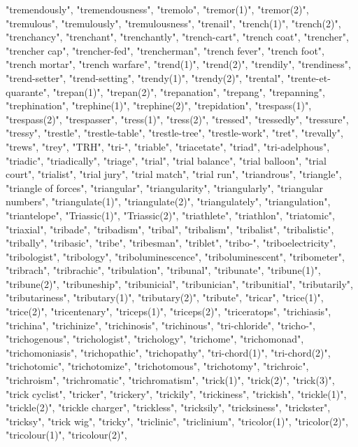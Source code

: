 "tremendously",
"tremendousness",
"tremolo",
"tremor(1)",
"tremor(2)",
"tremulous",
"tremulously",
"tremulousness",
"trenail",
"trench(1)",
"trench(2)",
"trenchancy",
"trenchant",
"trenchantly",
"trench-cart",
"trench coat",
"trencher",
"trencher cap",
"trencher-fed",
"trencherman",
"trench fever",
"trench foot",
"trench mortar",
"trench warfare",
"trend(1)",
"trend(2)",
"trendily",
"trendiness",
"trend-setter",
"trend-setting",
"trendy(1)",
"trendy(2)",
"trental",
"trente-et-quarante",
"trepan(1)",
"trepan(2)",
"trepanation",
"trepang",
"trepanning",
"trephination",
"trephine(1)",
"trephine(2)",
"trepidation",
"trespass(1)",
"trespass(2)",
"trespasser",
"tress(1)",
"tress(2)",
"tressed",
"tressedly",
"tressure",
"tressy",
"trestle",
"trestle-table",
"trestle-tree",
"trestle-work",
"tret",
"trevally",
"trews",
"trey",
"TRH",
"tri-",
"triable",
"triacetate",
"triad",
"tri-adelphous",
"triadic",
"triadically",
"triage",
"trial",
"trial balance",
"trial balloon",
"trial court",
"trialist",
"trial jury",
"trial match",
"trial run",
"triandrous",
"triangle",
"triangle of forces",
"triangular",
"triangularity",
"triangularly",
"triangular numbers",
"triangulate(1)",
"triangulate(2)",
"triangulately",
"triangulation",
"triantelope",
"Triassic(1)",
"Triassic(2)",
"triathlete",
"triathlon",
"triatomic",
"triaxial",
"tribade",
"tribadism",
"tribal",
"tribalism",
"tribalist",
"tribalistic",
"tribally",
"tribasic",
"tribe",
"tribesman",
"triblet",
"tribo-",
"triboelectricity",
"tribologist",
"tribology",
"triboluminescence",
"triboluminescent",
"tribometer",
"tribrach",
"tribrachic",
"tribulation",
"tribunal",
"tribunate",
"tribune(1)",
"tribune(2)",
"tribuneship",
"tribunicial",
"tribunician",
"tribunitial",
"tributarily",
"tributariness",
"tributary(1)",
"tributary(2)",
"tribute",
"tricar",
"trice(1)",
"trice(2)",
"tricentenary",
"triceps(1)",
"triceps(2)",
"triceratops",
"trichiasis",
"trichina",
"trichinize",
"trichinosis",
"trichinous",
"tri-chloride",
"tricho-",
"trichogenous",
"trichologist",
"trichology",
"trichome",
"trichomonad",
"trichomoniasis",
"trichopathic",
"trichopathy",
"tri-chord(1)",
"tri-chord(2)",
"trichotomic",
"trichotomize",
"trichotomous",
"trichotomy",
"trichroic",
"trichroism",
"trichromatic",
"trichromatism",
"trick(1)",
"trick(2)",
"trick(3)",
"trick cyclist",
"tricker",
"trickery",
"trickily",
"trickiness",
"trickish",
"trickle(1)",
"trickle(2)",
"trickle charger",
"trickless",
"tricksily",
"tricksiness",
"trickster",
"tricksy",
"trick wig",
"tricky",
"triclinic",
"triclinium",
"tricolor(1)",
"tricolor(2)",
"tricolour(1)",
"tricolour(2)",

